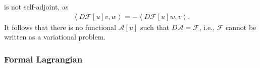 \documentclass[12pt,a4paper,reqno]{article}
\begin{document}
is not self-adjoint, as
\begin{align}
{\ensuremath{\left < {D \mathcal{F} [{\ensuremath{{\ensuremath{{u}}}}}] {\ensuremath{{\ensuremath{{v}}}}}, {\ensuremath{{\ensuremath{{w}}}}}} \right >}} = - {\ensuremath{\left < {D \mathcal{F} [{\ensuremath{{\ensuremath{{u}}}}}] {\ensuremath{{\ensuremath{{w}}}}}, {\ensuremath{{\ensuremath{{v}}}}}} \right >}} .
\end{align}
It follows that there is no functional $\mathcal{A} [u]$ such that ${\ensuremath{D}} \mathcal{A} = \mathcal{F}$, i.e., $\mathcal{F}$ cannot be written as a variational problem.

\subsubsection{Formal Lagrangian}
\label{sec:advection_formal_lagrangian}
\end{document}
